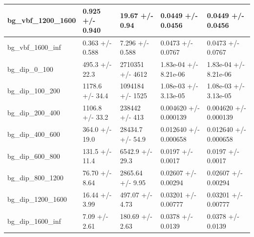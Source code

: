 \documentclass[a4paper, 10pt]{article}
\begin{document}
\begin{table}[H]
\begin{center}
\begin{tabular}{|m{20.0mm}|m{27.0mm}|m{27.0mm}|m{33.0mm}|m{32.0mm}|}
      \hline
      {\cellcolor{white}         bg\_vbf\_1200\_1600}& {\cellcolor{white}         0.925 +/\-- 0.940}& {\cellcolor{white}         19.67 +/\-- 0.94}& {\cellcolor{white}         0.0449 +/\-- 0.0456}& {\cellcolor{white}         0.0449 +/\-- 0.0456}\\
      \hline
      {\cellcolor{white}         bg\_vbf\_1600\_inf}& {\cellcolor{white}         0.363 +/\-- 0.588}& {\cellcolor{white}         7.296 +/\-- 0.588}& {\cellcolor{white}         0.0473 +/\-- 0.0767}& {\cellcolor{white}         0.0473 +/\-- 0.0767}\\
      \hline
      {\cellcolor{white}         bg\_dip\_0\_100}& {\cellcolor{white}         495.3 +/\-- 22.3}& {\cellcolor{white}         2710351 +/\-- 4612}& {\cellcolor{white}         1.83e-04 +/\-- 8.21e-06}& {\cellcolor{white}         1.83e-04 +/\-- 8.21e-06}\\
      \hline
      {\cellcolor{white}         bg\_dip\_100\_200}& {\cellcolor{white}         1178.6 +/\-- 34.4}& {\cellcolor{white}         1094184 +/\-- 1525}& {\cellcolor{white}         1.08e-03 +/\-- 3.13e-05}& {\cellcolor{white}         1.08e-03 +/\-- 3.13e-05}\\
      \hline
      {\cellcolor{white}         bg\_dip\_200\_400}& {\cellcolor{white}         1106.8 +/\-- 33.2}& {\cellcolor{white}         238442 +/\-- 413}& {\cellcolor{white}         0.004620 +/\-- 0.000139}& {\cellcolor{white}         0.004620 +/\-- 0.000139}\\
      \hline
      {\cellcolor{white}         bg\_dip\_400\_600}& {\cellcolor{white}         364.0 +/\-- 19.0}& {\cellcolor{white}         28434.7 +/\-- 54.9}& {\cellcolor{white}         0.012640 +/\-- 0.000658}& {\cellcolor{white}         0.012640 +/\-- 0.000658}\\
      \hline
      {\cellcolor{white}         bg\_dip\_600\_800}& {\cellcolor{white}         131.5 +/\-- 11.4}& {\cellcolor{white}         6542.9 +/\-- 29.3}& {\cellcolor{white}         0.0197 +/\-- 0.0017}& {\cellcolor{white}         0.0197 +/\-- 0.0017}\\
      \hline
      {\cellcolor{white}         bg\_dip\_800\_1200}& {\cellcolor{white}         76.70 +/\-- 8.64}& {\cellcolor{white}         2865.64 +/\-- 9.95}& {\cellcolor{white}         0.02607 +/\-- 0.00294}& {\cellcolor{white}         0.02607 +/\-- 0.00294}\\
      \hline
      {\cellcolor{white}         bg\_dip\_1200\_1600}& {\cellcolor{white}         16.44 +/\-- 3.99}& {\cellcolor{white}         497.07 +/\-- 4.73}& {\cellcolor{white}         0.03201 +/\-- 0.00777}& {\cellcolor{white}         0.03201 +/\-- 0.00777}\\
      \hline
      {\cellcolor{white}         bg\_dip\_1600\_inf}& {\cellcolor{white}         7.09 +/\-- 2.61}& {\cellcolor{white}         180.69 +/\-- 2.63}& {\cellcolor{white}         0.0378 +/\-- 0.0139}& {\cellcolor{white}         0.0378 +/\-- 0.0139}\\
\hline
    \end{tabular}
  \end{center}
\end{table}
\end{document}
